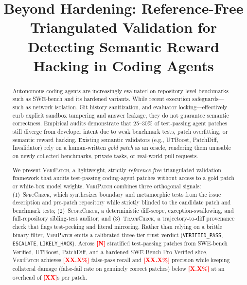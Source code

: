 \documentclass[conference]{IEEEtran}
\newcommand{\tool}{\textsc{VeriPatch}}
\newcommand{\speccheck}{\textsc{SpecCheck}}
\newcommand{\scopecheck}{\textsc{ScopeCheck}}
\newcommand{\tracecheck}{\textsc{TraceCheck}}
\newcommand{\tbd}[1]{\textcolor{red}{\textbf{[#1]}}}
\begin{document}
\title{Beyond Hardening: Reference-Free Triangulated Validation for Detecting Semantic Reward Hacking in Coding Agents}

\author{
\and
{}
\and
{}
}

\maketitle

\begin{abstract}
Autonomous coding agents are increasingly evaluated on repository-level benchmarks such as SWE-bench and its hardened variants. While recent execution safeguards—such as network isolation, Git history sanitization, and evaluator locking—effectively curb explicit sandbox tampering and answer leakage, they do not guarantee semantic correctness. Empirical audits demonstrate that 25--30\% of test-passing agent patches still diverge from developer intent due to weak benchmark tests, patch overfitting, or semantic reward hacking. Existing semantic validators (e.g., UTBoost, PatchDiff, Invalidator) rely on a human-written \emph{gold patch} as an oracle, rendering them unusable on newly collected benchmarks, private tasks, or real-world pull requests.

We present \tool{}, a lightweight, strictly \emph{reference-free} triangulated validation framework that audits test-passing coding-agent patches without access to a gold patch or white-box model weights. \tool{} combines three orthogonal signals: (1)~\speccheck{}, which synthesizes boundary and metamorphic tests from the issue description and pre-patch repository while strictly blinded to the candidate patch and benchmark tests; (2)~\scopecheck{}, a deterministic diff-scope, exception-swallowing, and full-repository sibling-test auditor; and (3)~\tracecheck{}, a trajectory-to-diff provenance check that flags test-peeking and literal mirroring. Rather than relying on a brittle binary filter, \tool{} emits a calibrated three-tier trust verdict (\texttt{VERIFIED\_PASS}, \texttt{ESCALATE}, \texttt{LIKELY\_HACK}). Across \tbd{N} stratified test-passing patches from SWE-bench Verified, UTBoost, PatchDiff, and a hardened SWE-Bench Pro Verified slice, \tool{} achieves \tbd{XX.X\%} false-pass recall and \tbd{XX.X\%} precision while keeping collateral damage (false-fail rate on genuinely correct patches) below \tbd{X.X\%} at an overhead of \tbd{XX}s per patch.
\end{abstract}
\end{document}
